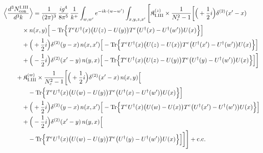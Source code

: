 \begingroup\small
\begin{align}\label{eq:S-I.III-2}
&\Big\langle\frac{d^{3}N^{\rm I.III}_{{\rm con}}}{d^{3}k}\Big\rangle=\frac{1}{(2\pi)^{3}}\, \frac{ig^{4}}{8\pi^{5}}\, \frac{1}{k^{+}} \int_{w,w'}e^{-ik\cdot(w-w')} \int_{x,y,z,x'}\Bigg[ \mathfrak{K}^{(z)}_{\rm I.III} \times \frac{1}{N_{c}^{2}-1}\bigg[\Big(+\frac{1}{2}i\Big)\delta^{(2)}(x'-x)\notag\\
&\quad\quad\quad \times n(x,y)\Big[ -{\rm Tr}\Big\{T^{e}U^{\dagger}(x)\big(U(z)-U(y)\big)T^{e}\big(U^{\dagger}(x)-U^{\dagger}(w')\big)U(x)\Big\}\Big]\notag\\
&\quad\quad\quad +\Big(+\frac{1}{2}i\Big)\delta^{(2)}(y-x)\, n(x,x')\Big[ -{\rm Tr}\Big\{T^{e}U^{\dagger}(x)\big(U(z)-U(x)\big)T^{e}\big(U^{\dagger}(x')-U^{\dagger}(w')\big)U(x)\Big\}\Big]\notag\\
&\quad\quad\quad +\Big(-\frac{1}{2}i\Big)\delta^{(2)}(x'-y)\, n(y,x)\Big[ -{\rm Tr}\Big\{T^{e}U^{\dagger}(x)\big(U(z)-U(y)\big)T^{e}\big(U^{\dagger}(y)-U^{\dagger}(w')\big)U(x)\Big\}\Big]\bigg]\notag\\
&\quad\quad + \mathfrak{K}^{(w)}_{\rm I.III} \times \frac{1}{N_{c}^{2}-1}\bigg[\Big(+\frac{1}{2}i\Big)\delta^{(2)}(x'-x)\, n(x,y)\Big[\notag\\
&\quad\quad\quad\quad -{\rm Tr}\Big\{T^{e}U^{\dagger}(x)\big(U(w)-U(y)\big)T^{e}\big(U^{\dagger}(x)-U^{\dagger}(w')\big)U(x)\Big\}\Big]\notag\\
&\quad\quad\quad +\Big(+\frac{1}{2}i\Big)\delta^{(2)}(y-x)\, n(x,x')\Big[ -{\rm Tr}\Big\{T^{e}U^{\dagger}(x)\big(U(w)-U(x)\big)T^{e}\big(U^{\dagger}(x')-U^{\dagger}(w')\big)U(x)\Big\}\Big]\notag\\
&\quad\quad\quad +\Big(-\frac{1}{2}i\Big)\delta^{(2)}(x'-y)\, n(y,x)\Big[\notag\\
&\quad\quad\quad\quad -{\rm Tr}\Big\{T^{e}U^{\dagger}(x)\big(U(w)-U(y)\big)T^{e}\big(U^{\dagger}(y)-U^{\dagger}(w')\big)U(x)\Big\}\Big]\bigg]\Bigg] +{\rm c.c.}
\end{align}
\endgroup

